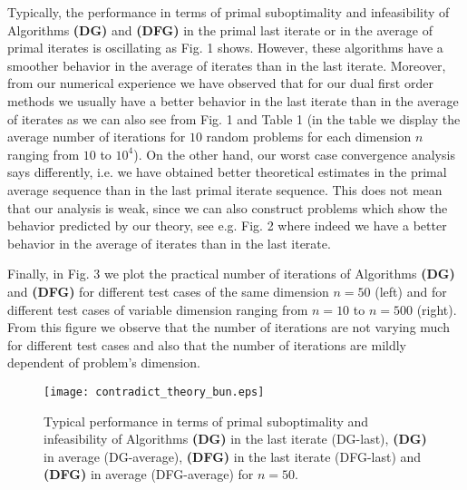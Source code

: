 \documentclass{gOMS2e}
\theoremstyle{plain}
\theoremstyle{definition}
\theoremstyle{remark}
\begin{document}
\noindent Typically, the performance  in  terms of primal
suboptimality and infeasibility of Algorithms \textbf{(DG)} and
\textbf{(DFG)} in the primal last iterate or in the  average of
primal iterates   is oscillating as Fig. 1 shows. However, these
algorithms have a smoother behavior  in the average of iterates than
in the last iterate.  Moreover, from our numerical experience we
have observed that for our dual first order methods we usually have
a better behavior in the last iterate than in the average of
iterates as we can also see from Fig. 1 and Table 1 (in the table we
display the average number of iterations for $10$ random problems
for each dimension $n$ ranging from $10$ to $10^4$). On the other
hand,  our  worst case convergence analysis says differently, i.e.
we have obtained better theoretical estimates in the primal  average
sequence than in the last primal  iterate sequence. This does not
mean that our  analysis is weak, since we can also construct
problems which show the behavior predicted by our theory, see e.g.
Fig. 2 where indeed we have a better behavior in the average of
iterates than in the last iterate.

\noindent Finally, in Fig. 3 we plot the practical  number of
iterations of Algorithms \textbf{(DG)} and \textbf{(DFG)} for
different test cases of the same dimension $n=50$ (left) and for
different test cases of variable dimension ranging from $n=10$ to
$n=500$ (right). From this figure we observe that the number of
iterations are not varying much for different test cases and also
that the number of iterations are mildly dependent of problem's
dimension.

\begin{figure}[ht]
\label{fig_contradict}
\caption{Typical performance  in terms of
primal suboptimality and infeasibility of
Algorithms \textbf{(DG)} in the last iterate (DG-last), \textbf{(DG)} in average (DG-average),
\textbf{(DFG)} in the last iterate (DFG-last) and \textbf{(DFG)} in average (DFG-average) for $n=50$.}
\centerline{\texttt{[image: contradict\_theory\_bun.eps]}}
\end{figure}
\end{document}
